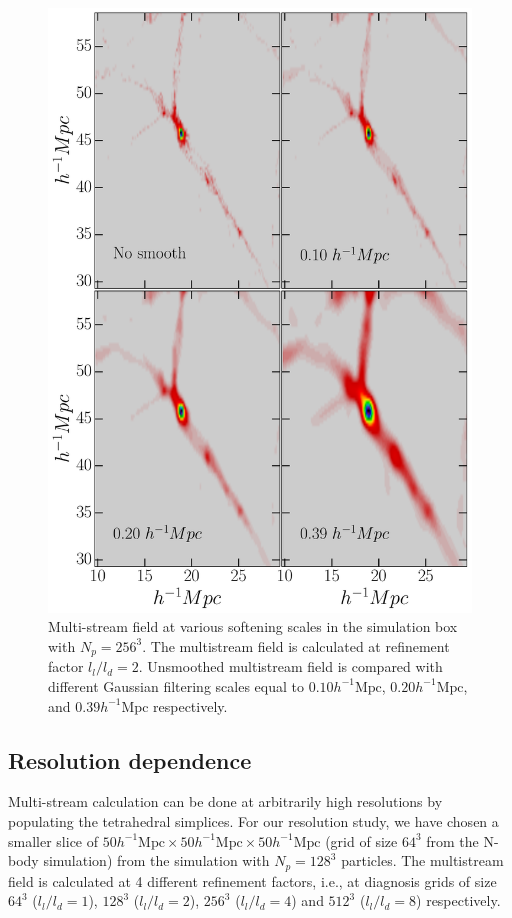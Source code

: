 \documentclass[fleqn,usenatbib,useAMS]{mnras}
\begin{document}
\begin{figure}
\begin{minipage}[t]{.99\linewidth}
  \centering\includegraphics[width=8.cm]{fig11.pdf} 

\end{minipage}\hfill
\caption{Multi-stream field at various softening scales in the simulation box with $N_p = 256^3$. The multistream field is calculated at refinement factor $l_l/l_d= 2$. Unsmoothed multistream field is compared with different Gaussian filtering scales equal to $0.10 h^{-1} \text{Mpc}$, $0.20 h^{-1} \text{Mpc}$, and $0.39 h^{-1} \text{Mpc}$ respectively.}
\label{fig:nstrSmoothSmall}
\end{figure}



\subsection{Resolution dependence}
\label{sub:resolution}

Multi-stream calculation can be done at arbitrarily high resolutions by populating the tetrahedral simplices. For our resolution study, we have chosen a smaller slice of $ 50 h^{-1} \text{Mpc} \times 50 h^{-1} \text{Mpc} \times 50 h^{-1} \text{Mpc}$ (grid of size $64^3$ from the N-body simulation) from the simulation with $N_p = 128^3$ particles. The multistream field is calculated at 4 different refinement factors, i.e., at diagnosis grids of size $64^3$ ($l_l/l_d = 1$), $128^3$ ($l_l/l_d = 2$), $256^3$ ($l_l/l_d = 4$)  and $512^3$ ($l_l/l_d = 8$) respectively.
\end{document}
